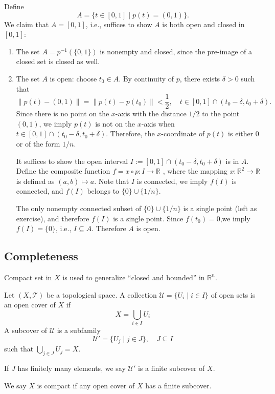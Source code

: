 \begin{example}
\begin{enumerate}
\begin{enumerate}
Define 
\[
A=\{t\in[0,1]\mid p(t)=(0,1)\}.
\]
We claim that $A=[0,1]$, i.e., suffices to show $A$ is both open and closed in $[0,1]$:
\begin{enumerate}
\item
The set $A=p^{-1}(\{0,1\})$ is nonempty and closed, since the pre-image of a closed set is closed as well.
\item
The set $A$ is open: choose $t_0\in A$. By continuity of $p$, there exists $\delta>0$ such that 
\[\|p(t) - (0,1)\|=
\|p(t) - p(t_0)\|<\frac{1}{2},\quad
t\in[0,1]\cap(t_0-\delta,t_0+\delta).
\]
\qquad Since there is no point on the $x$-axis with the distance $1/2$ to the point $(0,1)$, we imply $p(t)$ is not on the $x$-axis when $t\in[0,1]\cap(t_0-\delta,t_0+\delta).$
Therefore, the $x$-coordinate of $p(t)$ is either $0$ or of the form $1/n$.

\qquad It suffices to show the open interval $I:=[0,1]\cap(t_0-\delta,t_0+\delta)$ is in $A$. Define the composite function $f=x\circ p: I\to\mathbb{R}$ , where the mapping $x:\mathbb{R}^2\to\mathbb{R}$ is defined as $(a,b)\mapsto a$.
Note that $I$ is connected, we imply $f(I)$ is connected, and $f(I)$ belongs to $\{0\}\cup\{1/n\}$.

\qquad The only nonempty connected subset of $\{0\}\cup\{1/n\}$ is a single point (left as exercise), and therefore $f(I)$ is a single point.
Since $f(t_0) = 0$,we imply $f(I) = \{0\}$, i.e., $I\subseteq A$. Therefore $A$ is open.
\end{enumerate}
\end{enumerate}
\end{enumerate}
\end{example}

\subsection{Completeness}
Compact set in $X$ is used to generalize ``closed and bounded'' in $\mathbb{R}^n$.
\begin{definition}
Let $(X,\mathcal{T})$ be a topological space.
A collection $\mathcal{U}=\{U_i\mid i\in I\}$ of open sets is an open cover of $X$ if 
\[
X=\bigcup_{i\in I}U_i
\]
A subcover of $\mathcal{U}$ is a subfamily
\[
\mathcal{U}'=\{U_j\mid j\in J\}, \quad J\subseteq I
\]
such that $\bigcup_{j\in J}U_j=X$.

If $J$ has finitely many elements, we say $\mathcal{U}'$ is a finite subcover of $X$.

We say $X$ is compact if any open cover of $X$ has a finite subcover.
\end{definition}

